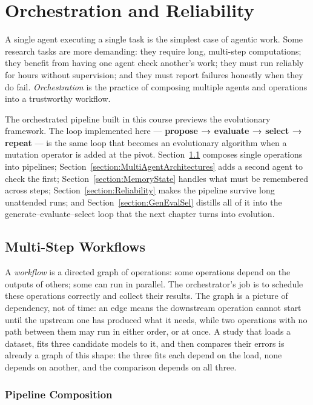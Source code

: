 \chapter{Orchestration and Reliability}
\label{chapter:Orchestration}

A single agent executing a single task is the simplest case of agentic work.
Some research tasks are more demanding: they require long, multi-step computations; they benefit from having one agent check another's work; they must run reliably for hours without supervision; and they must report failures honestly when they do fail.
\emph{Orchestration} is the practice of composing multiple agents and operations into a trustworthy workflow.

The orchestrated pipeline built in this course previews the evolutionary framework.
The loop implemented here — \textbf{propose → evaluate → select → repeat} — is the same loop that becomes an evolutionary algorithm when a mutation operator is added at the pivot.
Section~\ref{section:MultiStepWorkflows} composes single operations into pipelines; Section~\ref{section:MultiAgentArchitectures} adds a second agent to check the first; Section~\ref{section:MemoryState} handles what must be remembered across steps; Section~\ref{section:Reliability} makes the pipeline survive long unattended runs; and Section~\ref{section:GenEvalSel} distills all of it into the generate--evaluate--select loop that the next chapter turns into evolution.

\section{Multi-Step Workflows}
\label{section:MultiStepWorkflows}

A \emph{workflow} is a directed graph of operations: some operations depend on the outputs of others; some can run in parallel.
The orchestrator's job is to schedule these operations correctly and collect their results.
The graph is a picture of dependency, not of time: an edge means the downstream operation cannot start until the upstream one has produced what it needs, while two operations with no path between them may run in either order, or at once.
A study that loads a dataset, fits three candidate models to it, and then compares their errors is already a graph of this shape: the three fits each depend on the load, none depends on another, and the comparison depends on all three.

\subsection{Pipeline Composition}

